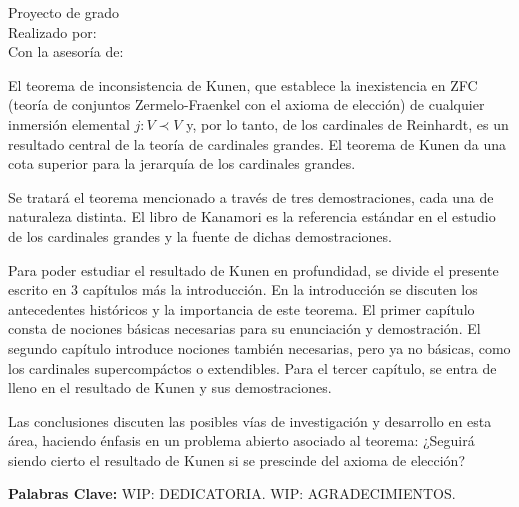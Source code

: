 \begin{center}
    \begin{minipage}{14cm}
        \centering
        \UppercaseBold
            {
                \MainTitle
            }
    \end{minipage}

    \vspace{.5cm}

    \UpperCase
        {
            Proyecto de grado
        } \\
    Realizado por: \autor \\
    Con la asesoría de: \tutor \\[.5cm]

\end{center}

El teorema de inconsistencia de Kunen, que establece la inexistencia en
ZFC (teoría de conjuntos Zermelo-Fraenkel con el axioma de elección)
de cualquier inmersión elemental $j\colon V\prec V$ y, por lo tanto, de los cardinales
de Reinhardt, es un resultado central de la teoría de cardinales grandes.
El teorema de Kunen da una cota superior para la jerarquía de los cardinales grandes.

Se tratará el teorema mencionado a través de tres demostraciones, cada una de naturaleza
distinta. El libro de Kanamori \autocite{cohen_independence_1964} es la referencia estándar
en el estudio de los cardinales grandes y la fuente
de dichas demostraciones.

Para poder estudiar el resultado de Kunen en profundidad,
se divide el presente escrito en 3 capítulos más la introducción.
En la introducción se discuten los antecedentes históricos y la importancia
de este teorema.
El primer capítulo consta de nociones básicas necesarias para su enunciación y demostración.
El segundo capítulo introduce nociones también necesarias, pero ya no básicas, como los cardinales
supercompáctos o extendibles.
Para el tercer capítulo, se entra de lleno en el resultado de Kunen y sus demostraciones.

Las conclusiones discuten las posibles vías de investigación y desarrollo en esta área,
haciendo énfasis en un problema abierto asociado al teorema:
¿Seguirá siendo cierto el resultado de Kunen si se prescinde del axioma de elección?

\vspace{\fill}

\textbf{Palabras Clave:}
\fi
\ifdedicatoria\newpage
WIP: DEDICATORIA.
\fi
\ifagradecimientos\newpage
WIP: AGRADECIMIENTOS.
\fi
\iflistas
